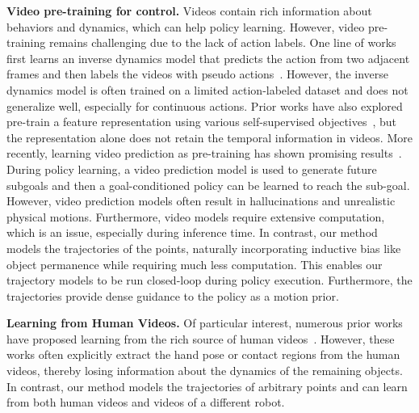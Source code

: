 \noindent\textbf{Video pre-training for control.} Videos contain rich information about behaviors and dynamics, which can help policy learning. However, video pre-training remains challenging due to the lack of action labels. One line of works first learns an inverse dynamics model that predicts the action from two adjacent frames and then labels the videos with pseudo actions~\cite{schmeckpeper2019learning, baker2022vpt, torabi2018behavioral,schmidt2024learning}. However, the inverse dynamics model is often trained on a limited action-labeled dataset and does not generalize well, especially for continuous actions. Prior works have also explored pre-train a feature representation using various self-supervised objectives~\cite{sermanet2017tcn,nair2023r3m,ma2023vip}, but the representation alone does not retain the temporal information in videos. More recently, learning video prediction as pre-training has shown promising results~\cite{du2023unipi,Ko2023Learning,bharadhwaj2023zero,yang2023learning,Escontrela23arXiv_VIPER}. During policy learning, a video prediction model is used to generate future subgoals and then a goal-conditioned policy can be learned to reach the sub-goal. However, video prediction models often result in hallucinations and unrealistic physical motions. Furthermore, video models require extensive computation, which is an issue, especially during inference time. In contrast, our method models the trajectories of the points, naturally incorporating inductive bias like object permanence while requiring much less computation. This enables our trajectory models to be run closed-loop during policy execution. Furthermore, the trajectories provide dense guidance to the policy as a motion prior.

\noindent\textbf{Learning from Human Videos.} Of particular interest, numerous prior works have proposed learning from the rich source of human videos~\cite{xiong2021learning,shao2021concept2robot, mendonca2023structured,bahl418affordances,shaw2023videodex,wang2023mimicplay}. However, these works often explicitly extract the hand pose or contact regions from the human videos, thereby losing information about the dynamics of the remaining objects. In contrast, our method models the trajectories of arbitrary points and can learn from both human videos and videos of a different robot.